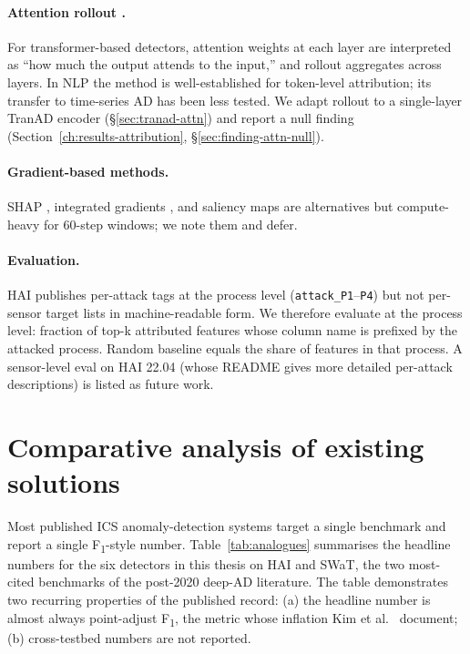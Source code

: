 \paragraph{Attention rollout \cite{abnar2020quantifying}.}  For transformer-based detectors, attention weights at each layer are interpreted as ``how much the output attends to the input,'' and rollout aggregates across layers.  In NLP the method is well-established for token-level attribution; its transfer to time-series AD has been less tested.  We adapt rollout to a single-layer TranAD encoder (\S\ref{sec:tranad-attn}) and report a null finding (Section~\ref{ch:results-attribution}, \S\ref{sec:finding-attn-null}).

\paragraph{Gradient-based methods.}  SHAP \cite{lundberg2017unified}, integrated gradients \cite{sundararajan2017axiomatic}, and saliency maps are alternatives but compute-heavy for 60-step windows; we note them and defer.

\paragraph{Evaluation.}  HAI publishes per-attack tags at the process level (\texttt{attack\_P1}--\texttt{P4}) but not per-sensor target lists in machine-readable form.  We therefore evaluate at the process level: fraction of top-k attributed features whose column name is prefixed by the attacked process.  Random baseline equals the share of features in that process.  A sensor-level eval on HAI 22.04 (whose README gives more detailed per-attack descriptions) is listed as future work.

\section{Comparative analysis of existing solutions}
\label{sec:analogues}

Most published ICS anomaly-detection systems target a single benchmark and report a single F\textsubscript{1}-style number.  Table~\ref{tab:analogues} summarises the headline numbers for the six detectors in this thesis on HAI and SWaT, the two most-cited benchmarks of the post-2020 deep-AD literature.  The table demonstrates two recurring properties of the published record: (a) the headline number is almost always point-adjust F\textsubscript{1}, the metric whose inflation Kim et al.~\cite{kim2022towards} document; (b) cross-testbed numbers are not reported.

